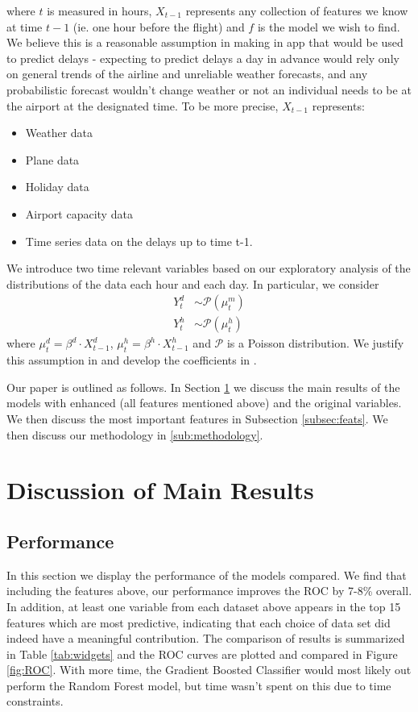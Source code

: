 \documentclass[twocolumn,showpacs,%
  nofootinbib,aps,superscriptaddress,%
  eqsecnum,prd,notitlepage,showkeys,10pt]{revtex4-1}
\begin{document}
where $t$ is measured in hours, $X_{t-1}$ represents any collection of features we know at time $t-1$ (ie. one hour before the flight) and $f$ is the model we wish to find. 
We believe this is a reasonable assumption in making
in app that would be used to predict delays - expecting to predict delays a day in advance would rely only on general trends of the airline and unreliable weather forecasts, and any probabilistic forecast wouldn't change weather or not an individual needs to be at the airport at the designated time. To be more precise, $X_{t-1}$ represents:
\begin{itemize}
\item Weather data \cite{weather}
\item Plane data \cite{aviation}
\item Holiday data 
\item Airport capacity data \cite{boarding}
\item Time series data on the delays up to time t-1. \cite{airline2}
\end{itemize}
We introduce two time relevant variables based on our exploratory analysis of the distributions of the data each hour and each day. In particular, we consider 
\begin{align} Y_t^{d} &\sim \mathcal{P}(\mu_t^m)\\
Y_t^{h} &\sim \mathcal{P}(\mu_t^h)
\end{align}
where $\mu_t^d = \beta^d \cdot X_{t-1}^d$, $\mu_t^h= \beta^h \cdot X_{t-1}^h$ and $\mathcal{P}$ is a Poisson distribution. We justify this assumption in \cite{airline1} and develop the coefficients in \cite{airline2}.

Our paper is outlined as follows. In Section \ref{sec:main} we discuss the main results of the models with enhanced (all features mentioned above)  and the original variables. We then discuss
the most important features in Subsection \ref{subsec:feats}. We then discuss our methodology in \ref{sub:methodology}.

\section{Discussion of Main Results}
\label{sec:main}

\subsection{Performance}


In this section we display the performance of the models compared. We find that including the features above, our performance improves the ROC by 7-8\% overall. In addition, at least one variable from each dataset above appears in the top 15
features which are most predictive, indicating that each choice of data set did indeed have a meaningful contribution. The comparison of results is summarized in Table \ref{tab:widgets} and the ROC curves are plotted and compared in Figure \ref{fig:ROC}. With more time, the Gradient Boosted Classifier would most likely out perform the Random Forest model, but time wasn't spent on this due to time constraints. 
\end{document}

